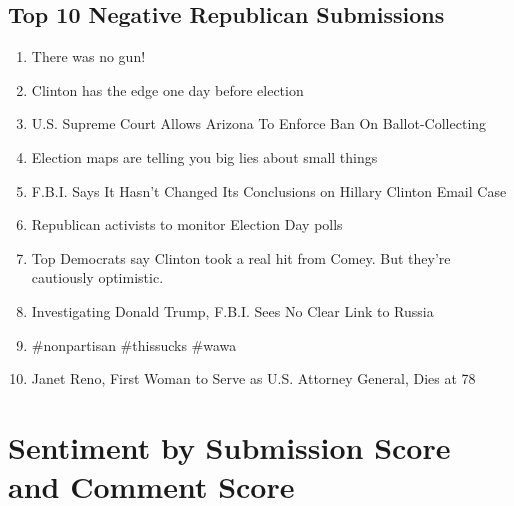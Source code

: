 \documentclass[12pt]{article}
\begin{document}
\subsection{Top 10 Negative Republican Submissions}

{\scriptsize
\begin{enumerate}
        \item There was no gun!
        \item Clinton has the edge one day before election
        \item U.S. Supreme Court Allows Arizona To Enforce Ban On Ballot-Collecting
        \item Election maps are telling you big lies about small things
        \item F.B.I. Says It Hasn't Changed Its Conclusions on Hillary Clinton Email Case
        \item Republican activists to monitor Election Day polls
        \item Top Democrats say Clinton took a real hit from Comey. But they're cautiously optimistic.
        \item Investigating Donald Trump, F.B.I. Sees No Clear Link to Russia
        \item \#nonpartisan \#thissucks \#wawa
        \item Janet Reno, First Woman to Serve as U.S. Attorney General, Dies at 78
\end{enumerate}
}

\section{Sentiment by Submission Score and Comment Score}
\end{document}
